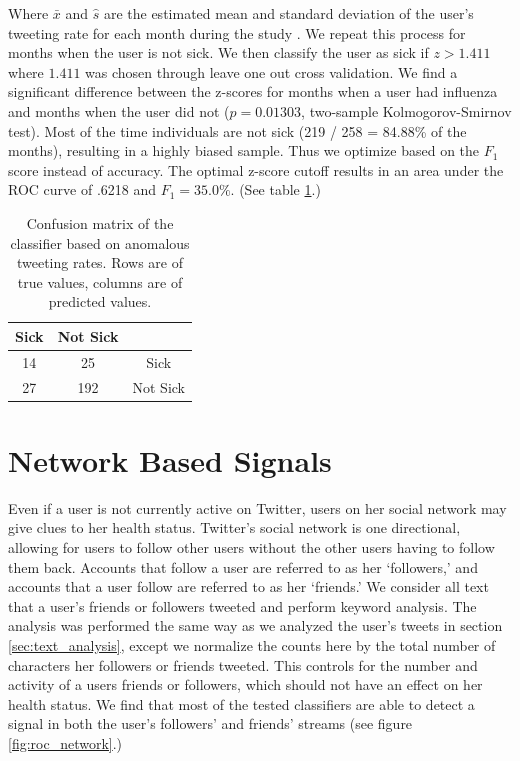 \documentclass{sig-alternate-2013}
\begin{document}
Where \(\bar{x}\) and \(\hat{s}\) are the estimated mean and standard deviation of the user's tweeting rate for each month during the study \cite{Grubs:1969ab}. We repeat this process for months when the user is not sick. We then classify the user as sick if \(z > 1.411\) where \(1.411\) was chosen through leave one out cross validation. We find a significant difference between the z-scores for months when a user had influenza and months when the user did not (\(p = 0.01303\), two-sample Kolmogorov-Smirnov test). Most of the time individuals are not sick (219 / 258 = 84.88\% of the months), resulting in a highly biased sample. Thus we optimize based on the \(F_1\) score instead of accuracy. The optimal z-score cutoff results in  an area under the ROC curve of .6218 and \(F_1= 35.0\%\). (See table \ref{tab:tweet_anomaly_confusion}.) 


\begin{table}[h]
\centering
\begin{tabular}{|c|c|c|} \hline
Sick&Not Sick&\ \\ \hline
14 & 25 & Sick\\ \hline
27 & 192 & Not Sick\\
\hline\end{tabular}
\caption{Confusion matrix of the classifier based on anomalous tweeting rates. Rows are of true values, columns are of predicted values.}
\label{tab:tweet_anomaly_confusion}
\end{table}

\section{Network Based Signals}

Even if a user is not currently active on Twitter, users on her social network may give clues to her health status. Twitter's social network is one directional, allowing for users to follow other users without the other users having to follow them back. Accounts that follow a user are referred to as her `followers,' and accounts that a user follow are referred to as her `friends.' We consider all text that a user's friends or followers tweeted and perform keyword analysis. The analysis was performed the same way as we analyzed the user's tweets in section \ref{sec:text_analysis}, except we normalize the counts here by the total number of characters her followers or friends tweeted. This controls for the number and activity of a users friends or followers, which should not have an effect on her health status. We find that most of the tested classifiers are able to detect a signal in both the user's followers' and friends' streams (see figure \ref{fig:roc_network}.)
\end{document}
